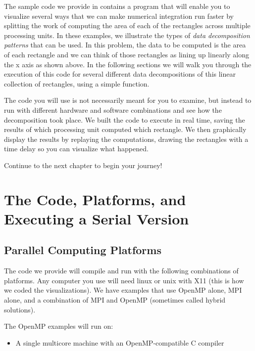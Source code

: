 \documentclass[letterpaper,10pt,openany,oneside]{sphinxmanual}
\begin{document}
The sample code we provide in  contains a program that will enable you to visualize several ways that we can make numerical integration run faster by splitting the work of computing the area of each of the rectangles across multiple processing units.  In these examples, we illustrate the types of \emph{data decomposition patterns} that can be used.  In this problem, the data to be computed is the area of each rectangle and we can think of those rectangles as lining up linearly along the x axis as shown above. In the following sections we will walk you through the execution of this code for several different data decompositions of this linear collection of rectangles, using a simple function.

The code you will use is not necessarily meant for you to examine, but instead to run with different hardware and software combinations and see how the decomposition took place.  We built the code to execute in real time, saving the results of which processing unit computed which rectangle. We then graphically display the results by replaying the computations, drawing the rectangles with a time delay so you can visualize what happened.

Continue to the next chapter to begin your journey!


\chapter{The Code, Platforms, and Executing a Serial Version}
\label{Code_Serial::doc}\label{Code_Serial:the-code-platforms-and-executing-a-serial-version}

\section{Parallel Computing Platforms}
\label{Code_Serial:parallel-computing-platforms}
The code we provide will compile and run with the following combinations of platforms. Any computer you use will need linux or unix with X11 (this is how we coded the visualizations).  We have examples that use OpenMP alone, MPI alone, and a combination of MPI and OpenMP (sometimes called hybrid solutions).

The OpenMP examples will run on:
\begin{itemize}
\item {} 
A single multicore machine with an OpenMP-compatible C compiler

\end{itemize}
\end{document}
